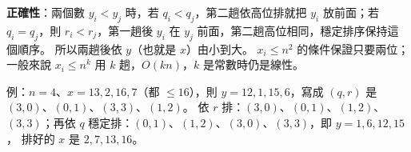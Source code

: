 \begin{pastsoln}
\textbf{正確性}：兩個數 $y_i < y_j$ 時，若 $q_i < q_j$，第二趟依高位排就把 $y_i$ 放前面；若 $q_i = q_j$，則 $r_i < r_j$，第一趟後 $y_i$ 在
$y_j$ 前面，第二趟高位相同，穩定排序保持這個順序。 所以兩趟後依 $y$（也就是 $x$）由小到大。 $x_i \le n^2$ 的條件保證只要兩位；
一般來說 $x_i \le n^k$ 用 $k$ 趟，$O(kn)$，$k$ 是常數時仍是線性。

例：$n = 4$、$x = 13, 2, 16, 7$（都 $\le 16$），則 $y = 12, 1, 15, 6$，寫成 $(q, r)$ 是 $(3,0)$、$(0,1)$、$(3,3)$、$(1,2)$。
依 $r$ 排：$(3,0)$、$(0,1)$、$(1,2)$、$(3,3)$；再依 $q$ 穩定排：$(0,1)$、$(1,2)$、$(3,0)$、$(3,3)$，即 $y = 1, 6, 12, 15$，
排好的 $x$ 是 $2, 7, 13, 16$。
\end{pastsoln}
